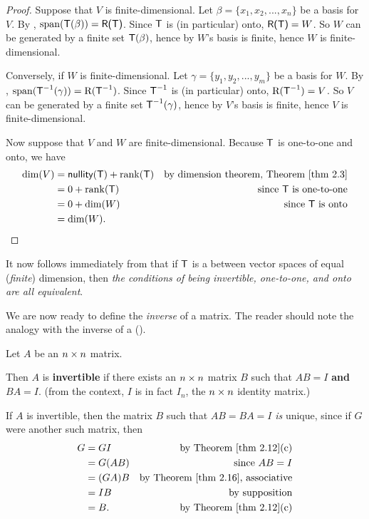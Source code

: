 \begin{proof}
Suppose that \(V\) is finite-dimensional. Let \(\beta = \{ x_1, x_2, ..., x_n \}\) be a basis for \(V\).
By , \(\operatorname{span}(\textsf{T}(\beta)) = \textsf{R(T)}\).
Since \(\textsf{T}\) is (in particular) onto, \(\textsf{R(T)} = W\).
So \(W\) can be generated by a finite set \(\textsf{T}(\beta)\), hence by  \(W\)'s basis is finite, hence \(W\) is finite-dimensional.

Conversely, if \(W\) is finite-dimensional. Let \(\gamma = \{ y_1, y_2, ..., y_m \}\) be a basis for \(W\).
By , \(\operatorname{span}(\textsf{T}^{-1}(\gamma)) = \mathrm{R}(\textsf{T}^{-1})\).
Since \(\textsf{T}^{-1}\) is (in particular) onto, \(\mathrm{R}(\textsf{T}^{-1}) = V\).
So \(V\) can be generated by a finite set \(\textsf{T}^{-1}(\gamma)\), hence by  \(V\)'s basis is finite, hence \(V\) is finite-dimensional.

Now suppose that \(V\) and \(W\) are finite-dimensional.
Because \(\textsf{T}\) is one-to-one and onto, we have
\begin{align*}
    \dim(V) & = \nullityT + \rankT & \text{by dimension theorem, \THM{2.3}} \\
            & = 0 + \rankT & \text{since \(\T\) is one-to-one} \\
            & = 0 + \dim(W) & \text{since \(\T\) is onto} \\
            & = \dim(W).
\end{align*}
\end{proof}

\begin{remark} \label{remark 2.4.1}
It now follows immediately from  that if \(\textsf{T}\) is a \LTRAN{} between vector spaces of equal (\emph{finite}) dimension, then \emph{the conditions of being invertible, one-to-one, and onto are all equivalent}.
\end{remark}

We are now ready to define the \emph{inverse} of a matrix.
The reader should note the analogy with the inverse of a \LTRAN{}().

\begin{definition} \label{def 2.13}
Let \(A\) be an \(n \times n\) matrix.

 Then \(A\) is \textbf{invertible} if there exists an \(n \times n\) matrix \(B\) such that \(AB = I\) \textbf{and} \(BA = I\).
(from the context, \(I\) is in fact \(I_n\), the \(n \times n\) identity matrix.)
\end{definition}

 If \(A\) is invertible, then the matrix \(B\) such that \(AB = BA = I\) \emph{is} unique, since if \(G\) were another such matrix, then
\begin{align*}
    G & = GI & \text{by \THM{2.12}(c)} \\
      & = G(AB) & \text{since \(AB = I\)} \\
      & = (GA)B & \text{by \THM{2.16}, associative} \\
      & = IB & \text{by supposition} \\
      & = B. & \text{by \THM{2.12}(c)}
\end{align*}

